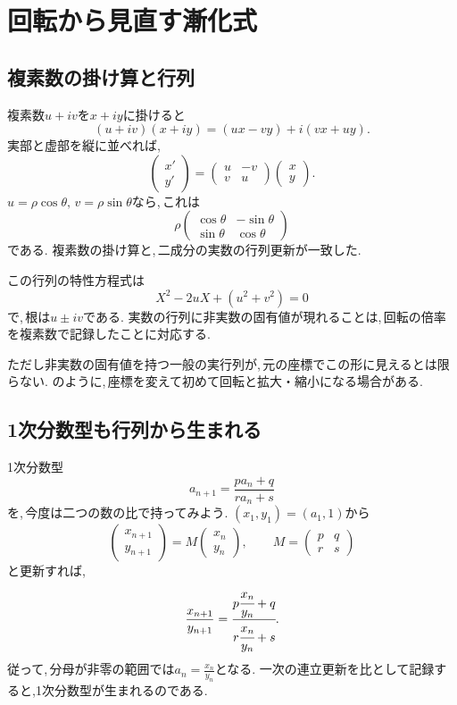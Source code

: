 \section{回転から見直す漸化式}\label{節：回転から見直す}
\subsection{複素数の掛け算と行列}

複素数$u+iv$を$x+iy$に掛けると
\[
 (u+iv)(x+iy)=(ux-vy)+i(vx+uy).
\]
実部と虚部を縦に並べれば,
\[
 \begin{pmatrix}x'\\y'\end{pmatrix}
 =
 \begin{pmatrix}u&-v\\v&u\end{pmatrix}
 \begin{pmatrix}x\\y\end{pmatrix}.
\]
$u=\rho\cos\theta,\,v=\rho\sin\theta$なら,\,これは
\[
 \rho
 \begin{pmatrix}
 \cos\theta&-\sin\theta\\
 \sin\theta&\cos\theta
 \end{pmatrix}
\]
である. 複素数の掛け算と,\,二成分の実数の行列更新が一致した.

この行列の特性方程式は
\[
 X^2-2uX+(u^2+v^2)=0
\]
で,\,根は$u\pm iv$である.
実数の行列に非実数の固有値が現れることは,\,回転の倍率を複素数で記録したことに対応する.

ただし非実数の固有値を持つ一般の実行列が,\,元の座標でこの形に見えるとは限らない.
のように,\,座標を変えて初めて回転と拡大・縮小になる場合がある.

\subsection{1次分数型も行列から生まれる}\label{節：分数と行列の合流}

1次分数型
\[
 a_{n+1}=\frac{pa_n+q}{ra_n+s}
\]
を,\,今度は二つの数の比で持ってみよう.
$(x_1,y_1)=(a_1,1)$から
\[
 \begin{pmatrix}x_{n+1}\\y_{n+1}\end{pmatrix}
 =M\begin{pmatrix}x_n\\y_n\end{pmatrix},
 \qquad
 M=\begin{pmatrix}p&q\\r&s\end{pmatrix}
\]
と更新すれば,
\[
 \frac{x_{n+1}}{y_{n+1}}
 =\cfrac{p\cfrac{x_n}{y_n}+q}{r\cfrac{x_n}{y_n}+s}.
\]
従って,\,分母が非零の範囲では$a_n=\frac{x_n}{y_n}$となる.
一次の連立更新を比として記録すると,1次分数型が生まれるのである.

